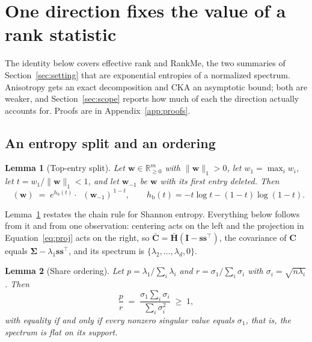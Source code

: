 \documentclass{article}
\theoremstyle{spaced}
\newtheorem{lemma}{Lemma}
\theoremstyle{definition}
\DeclareMathOperator{\Hexp}{H_{\exp}}
\newcommand{\bH}{\mathbf{H}}
\newcommand{\bC}{\mathbf{C}}
\newcommand{\bs}{\mathbf{s}}
\newcommand{\bw}{\mathbf{w}}
\newcommand{\bI}{\mathbf{I}}
\newcommand{\bSig}{\boldsymbol{\Sigma}}
\newcommand{\hb}{h_{\mathrm{b}}}
\begin{document}
\section{One direction fixes the value of a rank statistic}
\label{sec:algebra}

The identity below covers effective rank and RankMe, the two summaries of Section~\ref{sec:setting} that are exponential entropies of a normalized spectrum. Anisotropy gets an exact decomposition and CKA an asymptotic bound; both are weaker, and Section~\ref{sec:scope} reports how much of each the direction actually accounts for. Proofs are in Appendix~\ref{app:proofs}.

\subsection{An entropy split and an ordering}

\begin{lemma}[Top-entry split]
\label{lem:split}
Let $\bw \in \mathbb{R}^m_{\ge 0}$ with $\|\bw\|_1 > 0$, let $w_1 = \max_i w_i$, let $t = w_1/\|\bw\|_1 < 1$, and let $\bw_{-1}$ be $\bw$ with its first entry deleted. Then
\begin{equation}
\label{eq:split}
\Hexp(\bw) \;=\; e^{\hb(t)} \cdot \Hexp(\bw_{-1})^{\,1-t}, \qquad \hb(t) = -t\log t - (1-t)\log(1-t).
\end{equation}
\end{lemma}

Lemma~\ref{lem:split} restates the chain rule for Shannon entropy. Everything below follows from it and from one observation: centering acts on the left and the projection in Equation~\ref{eq:proj} acts on the right, so $\bar{\bC} = \bar{\bH}(\bI - \bs\bs^\top)$, the covariance of $\bC$ equals $\bSig - \lambda_1 \bs\bs^\top$, and its spectrum is $\{\lambda_2,\dots,\lambda_d, 0\}$.

\begin{lemma}[Share ordering]
\label{lem:order}
Let $p = \lambda_1/\sum_i \lambda_i$ and $r = \sigma_1/\sum_i \sigma_i$ with $\sigma_i = \sqrt{n\lambda_i}$. Then
\begin{equation}
\label{eq:order}
\frac{p}{r} \;=\; \frac{\sigma_1 \sum_i \sigma_i}{\sum_i \sigma_i^2} \;\ge\; 1 ,
\end{equation}
with equality if and only if every nonzero singular value equals $\sigma_1$, that is, the spectrum is flat on its support.
\end{lemma}
\end{document}
